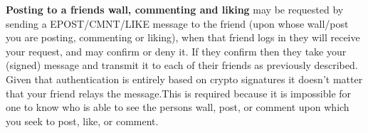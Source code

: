 \textbf{Posting to a friends wall, commenting and liking} may be requested by
sending a EPOST/CMNT/LIKE message to the friend (upon whose wall/post you are
posting, commenting or liking), when that friend logs in they will receive your
request, and may confirm or deny it. If they confirm then they take your (signed)
message and transmit it to each of their friends as previously described. Given
that authentication is entirely based on crypto signatures it doesn't matter
that your friend relays the message.This is required because it is impossible
for one to know who is able to see the persons wall, post, or comment upon which
you seek to post, like, or comment.
